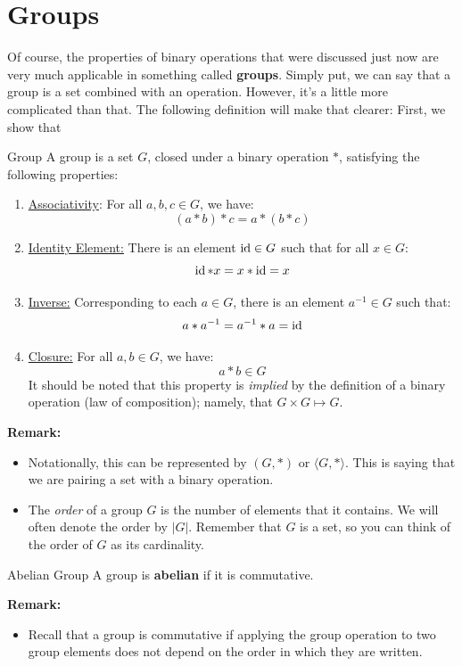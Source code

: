\documentclass[letterpaper]{article}
\begin{document}
\section{Groups}
Of course, the properties of binary operations that were discussed just now are very much applicable in something called \textbf{groups}. Simply put, we can say that a group is a set combined with an operation. However, it's a little more complicated than that. The following definition will make that clearer:
First, we show that\begin{definition}{Group}{}
    A group is a set $G$, closed under a binary operation $*$, satisfying the following properties:
    \begin{enumerate}
        \item \underline{Associativity}: For all $a, b, c \in G$, we have:
        \[(a * b) * c = a * (b * c)\]

        \item \underline{Identity Element:} There is an element $\operatorname{id} \in G$ such that for all $x \in G$:
        \[\operatorname{id} * x = x * \operatorname{id} = x\]

        \item \underline{Inverse:} Corresponding to each $a \in G$, there is an element $a^{-1} \in G$ such that:
        \[a * a^{-1} = a^{-1} * a = \operatorname{id}\]

        \item \underline{Closure:} For all $a, b \in G$, we have:
        \[a * b \in G\]
        It should be noted that this property is \emph{implied} by the definition of a binary operation (law of composition); namely, that $G \times G \mapsto G$.  
    \end{enumerate}
\end{definition}
\textbf{Remark:}
\begin{itemize}
    \item Notationally, this can be represented by $(G, *)$ or $\langle G, * \rangle$. This is saying that we are pairing a set with a binary operation. 
    \item The \emph{order} of a group $G$ is the number of elements that it contains. We will often denote the order by $|G|$. Remember that $G$ is a set, so you can think of the order of $G$ as its cardinality. 
\end{itemize}

\begin{definition}{Abelian Group}{}
    A group is \textbf{abelian} if it is commutative.
\end{definition}
\textbf{Remark:}
\begin{itemize}
    \item Recall that a group is commutative if applying the group operation to two group elements does not depend on the order in which they are written. 
\end{itemize}
\end{document}
